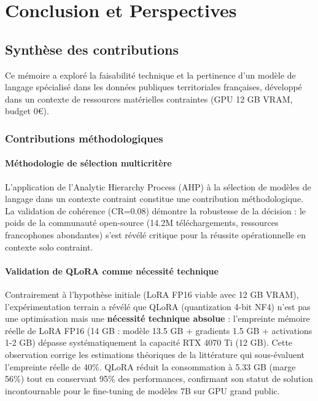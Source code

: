 
\chapter{Conclusion et Perspectives}

\section{Synthèse des contributions}

Ce mémoire a exploré la faisabilité technique et la pertinence d'un modèle de langage spécialisé dans les données publiques territoriales françaises, développé dans un contexte de ressources matérielles contraintes (GPU 12 GB VRAM, budget 0€).

\subsection{Contributions méthodologiques}

\subsubsection{Méthodologie de sélection multicritère}

L'application de l'Analytic Hierarchy Process (AHP) à la sélection de modèles de langage dans un contexte contraint constitue une contribution méthodologique. La validation de cohérence (CR=0.08) démontre la robustesse de la décision : le poids de la communauté open-source (14.2M téléchargements, ressources francophones abondantes) s'est révélé critique pour la réussite opérationnelle en contexte solo contraint.

\subsubsection{Validation de QLoRA comme nécessité technique}

Contrairement à l'hypothèse initiale (LoRA FP16 viable avec 12 GB VRAM), l'expérimentation terrain a révélé que QLoRA (quantization 4-bit NF4) n'est pas une optimisation mais une \textbf{nécessité technique absolue} : l'empreinte mémoire réelle de LoRA FP16 (14 GB : modèle 13.5 GB + gradients 1.5 GB + activations 1-2 GB) dépasse systématiquement la capacité RTX 4070 Ti (12 GB). Cette observation corrige les estimations théoriques de la littérature \citep{dettmers2023qlora} qui sous-évaluent l'empreinte réelle de 40\%. QLoRA réduit la consommation à 5.33 GB (marge 56\%) tout en conservant 95\% des performances, confirmant son statut de solution incontournable pour le fine-tuning de modèles 7B sur GPU grand public.

